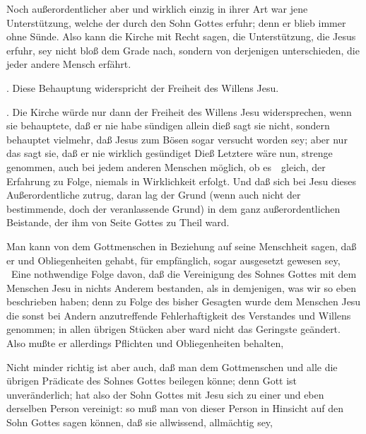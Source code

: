 \begin{aufza}
Noch außerordentlicher aber und wirklich einzig in ihrer Art war jene Unterstützung, welche der  durch den Sohn Gottes erfuhr; denn er blieb immer ohne Sünde. Also kann die Kirche mit Recht sagen, die Unterstützung, die Jesus erfuhr, sey nicht bloß dem Grade nach, sondern  von derjenigen unterschieden, die jeder andere Mensch erfährt. \par
{}. Diese Behauptung widerspricht der Freiheit des Willens Jesu.\par 
{}. Die Kirche würde nur dann der Freiheit des Willens Jesu widersprechen, wenn sie behauptete, daß er nie habe sündigen  allein dieß sagt sie nicht, sondern behauptet vielmehr, daß Jesus zum Bösen sogar versucht worden sey; aber nur das sagt sie, daß er  nie wirklich gesündiget  Dieß Letztere wäre nun, strenge genommen, auch bei jedem anderen Menschen möglich, ob es~\ gleich, der Erfahrung zu Folge, niemals in Wirklichkeit erfolgt. Und daß sich bei Jesu dieses Außerordentliche zutrug, daran lag der Grund (wenn auch nicht der bestimmende, doch der veranlassende Grund) in dem ganz außerordentlichen Beistande, der ihm von Seite Gottes zu Theil ward.
\item Man kann von dem Gottmenschen in Beziehung auf seine Menschheit sagen, daß er  und Obliegenheiten gehabt, für  empfänglich, sogar  ausgesetzt gewesen sey, \usw\ Eine nothwendige Folge davon, daß die Vereinigung des Sohnes Gottes mit dem Menschen Jesu in nichts Anderem bestanden, als in demjenigen, was wir so eben beschrieben haben; denn zu Folge des bisher Gesagten wurde dem Menschen Jesu die sonst bei Andern anzutreffende Fehlerhaftigkeit des Verstandes und Willens genommen; in allen übrigen Stücken aber ward nicht das Geringste geändert. Also mußte er allerdings Pflichten und Obliegenheiten behalten, \usw\
\item Nicht minder richtig ist aber auch, daß man dem Gottmenschen  und alle die übrigen Prädicate des Sohnes Gottes beilegen könne; denn Gott ist unveränderlich; hat also der Sohn Gottes mit Jesu sich zu einer und eben derselben Person vereinigt: so muß man von dieser Person in Hinsicht auf den Sohn Gottes sagen können, daß sie allwissend, allmächtig sey, \usw\

\end{aufza}
